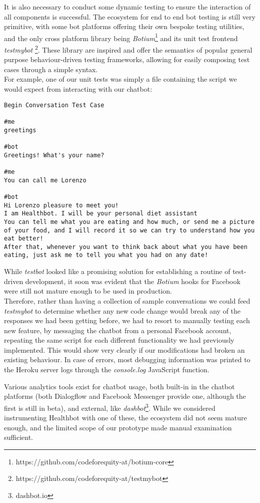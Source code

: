 It is also necessary to conduct some dynamic testing to ensure the interaction of all components is successful. The ecosystem for end to end bot testing is still very primitive, with some bot platforms offering their own bespoke testing utilities, and the only cross platform library being \textit{Botium}\footnote{https://github.com/codeforequity-at/botium-core} and its unit test frontend \textit{testmybot} \footnote{https://github.com/codeforequity-at/testmybot}. These library are inspired and offer the semantics of popular general purpose behaviour-driven testing frameworks, allowing for easily composing test cases through a simple syntax. \\
For example, one of our unit tests was simply a file containing the script we would expect from interacting with our chatbot:
\begin{lstlisting}
Begin Conversation Test Case

#me
greetings

#bot
Greetings! What's your name?

#me
You can call me Lorenzo

#bot
Hi Lorenzo pleasure to meet you!
I am Healthbot. I will be your personal diet assistant
You can tell me what you are eating and how much, or send me a picture of your food, and I will record it so we can try to understand how you eat better!
After that, whenever you want to think back about what you have been eating, just ask me to tell you what you had on any date!
\end{lstlisting}
While \textit{testbot} looked like a promising solution for establishing a routine of test-driven development, it soon was evident that the \textit{Botium} hooks for Facebook were still not mature enough to be used in production. \\
Therefore, rather than having a collection of sample conversations we could feed \textit{testmybot} to determine whether any new code change would break any of the responses we had been getting before, we had to resort to manually testing each new feature, by messaging the chatbot from a personal Facebook account, repeating the same script for each different functionality we had previously implemented. This would show very clearly if our modifications had broken an existing behaviour. In case of errors, most debugging information was printed to the Heroku server logs through the \textit{console.log} JavaScript function.

Various analytics tools exist for chatbot usage, both built-in in the chatbot platforms (both Dialogflow and Facebook Messenger provide one, although the first is still in beta), and external, like \textit{dashbot}\footnote{dashbot.io}. While we considered instrumenting Healthbot with one of these, the ecosystem did not seem mature enough, and the limited scope of our prototype made manual examination sufficient.


